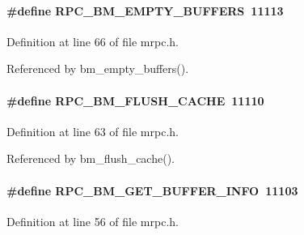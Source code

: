 \paragraph[{RPC\_\-BM\_\-EMPTY\_\-BUFFERS}]{\setlength{\rightskip}{0pt plus 5cm}\#define RPC\_\-BM\_\-EMPTY\_\-BUFFERS~11113}\hfill\label{group__mrpcdefineh_gabda66a6b961c81625a3185c68b2673f9}

\begin{DoxyItemize}
\item 
\end{DoxyItemize}

Definition at line 66 of file mrpc.h.

Referenced by bm\_\-empty\_\-buffers().
\paragraph[{RPC\_\-BM\_\-FLUSH\_\-CACHE}]{\setlength{\rightskip}{0pt plus 5cm}\#define RPC\_\-BM\_\-FLUSH\_\-CACHE~11110}\hfill\label{group__mrpcdefineh_gaea9459a45b400149d4e5910a5da5e52c}

\begin{DoxyItemize}
\item 
\end{DoxyItemize}

Definition at line 63 of file mrpc.h.

Referenced by bm\_\-flush\_\-cache().
\paragraph[{RPC\_\-BM\_\-GET\_\-BUFFER\_\-INFO}]{\setlength{\rightskip}{0pt plus 5cm}\#define RPC\_\-BM\_\-GET\_\-BUFFER\_\-INFO~11103}\hfill\label{group__mrpcdefineh_ga3086fb047ff3c4156f9403acff41536b}

\begin{DoxyItemize}
\item 
\end{DoxyItemize}

Definition at line 56 of file mrpc.h.
